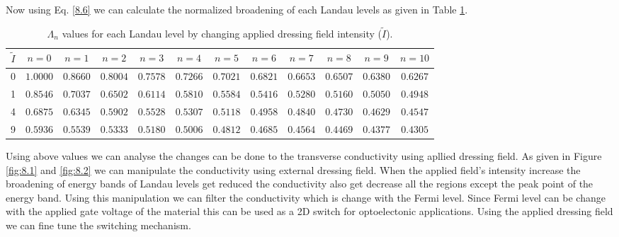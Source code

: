 \noindent
Now using Eq. \eqref{8.6} we can calculate the normalized broadening of each Landau levels as given in Table \ref{tab:8.1}.

\begin{table}[ht!]
\begin{center}
\begin{tabular}{ |c|c|c|c|c|c|c|c|c|c|c|c| }
 \hline
 ${\tilde{I}}$
 & $n=0$ & $n=1$ & $n=2$ & $n=3$ & $n=4$ & $n=5$ & $n=6$ & $n=7$ & $n=8$ & $n=9$
 & $n=10$
 \\ [0.5ex] \hline\hline
 0  & $1.0000$ & $0.8660$ & $0.8004$ & $0.7578$ & $0.7266$
 & $0.7021$ & $0.6821$ & $0.6653$ & $0.6507$ & $0.6380$& $0.6267$ \\ \hline
 1  & $0.8546$ & $0.7037$ & $0.6502$ & $0.6114$ & $0.5810$
 & $0.5584$ & $0.5416$ & $0.5280$ & $0.5160$ & $0.5050$ & $0.4948$ \\ \hline
 4  & $0.6875$ & $0.6345$ & $0.5902$ & $0.5528$ & $0.5307$
 & $0.5118$ & $0.4958$ & $0.4840$ & $0.4730$ & $0.4629$  & $0.4547$ \\ \hline
 9  & $0.5936$ & $0.5539$ & $0.5333$ & $0.5180$ & $0.5006$
 & $0.4812$ & $0.4685$ & $0.4564$ & $0.4469$ & $0.4377$  & $0.4305$ \\ \hline
\end{tabular}
\caption {\label{tab:8.1} $\Lambda_n$ values for each Landau level by changing  applied dressing field intensity ($\tilde{I}$). }
\end{center}
\end{table}

\noindent
Using above values we can analyse the changes can be done to the transverse conductivity using apllied dressing field. As given in Figure \ref{fig:8.1} and \ref{fig:8.2} we can manipulate the conductivity using external dressing field. When the applied field's intensity increase the broadening of energy bands of Landau levels get reduced the conductivity also get decrease all the regions except the peak point of the energy band. Using this manipulation we can filter the conductivity which is change with the Fermi level. Since Fermi level can be change with the applied gate voltage of the material this can be used as a 2D switch for optoelectonic applications. Using the applied dressing field we can fine tune the switching mechanism.

